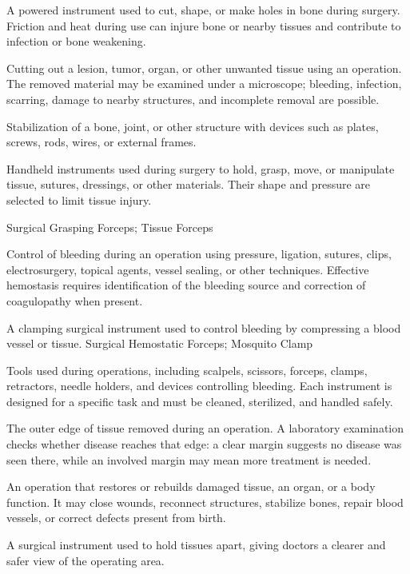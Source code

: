  A powered instrument used to cut, shape, or make holes in bone during surgery. Friction and heat during use can injure bone or nearby tissues and contribute to infection or bone weakening.

 Cutting out a lesion, tumor, organ, or other unwanted tissue using an operation. The removed material may be examined under a microscope; bleeding, infection, scarring, damage to nearby structures, and incomplete removal are possible.

 Stabilization of a bone, joint, or other structure with devices such as plates, screws, rods, wires, or external frames.

 Handheld instruments used during surgery to hold, grasp, move, or manipulate tissue, sutures, dressings, or other materials. Their shape and pressure are selected to limit tissue injury.

\synonyms
Surgical Grasping Forceps; Tissue Forceps

 Control of bleeding during an operation using pressure, ligation, sutures, clips,
electrosurgery, topical agents, vessel sealing, or other techniques. Effective
hemostasis requires identification of the bleeding source and correction of coagulopathy
when present.

 A clamping surgical instrument used to control bleeding by compressing a blood vessel or tissue.
\synonyms
Surgical Hemostatic Forceps; Mosquito Clamp

 Tools used during operations, including scalpels, scissors, forceps, clamps, retractors, needle holders, and devices controlling bleeding. Each instrument is designed for a specific task and must be cleaned, sterilized, and handled safely.

 The outer edge of tissue removed during an operation. A laboratory examination checks whether disease reaches that edge: a clear margin suggests no disease was seen there, while an involved margin may mean more treatment is needed.

 An operation that restores or rebuilds damaged tissue, an organ, or a body function. It may close wounds, reconnect structures, stabilize bones, repair blood vessels, or correct defects present from birth.

 A surgical instrument used to hold tissues apart, giving doctors a clearer and safer view of the operating area.


